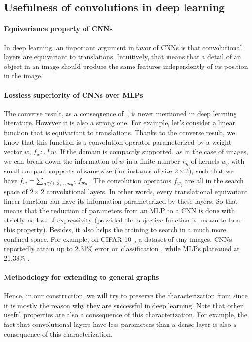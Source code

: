 \subsection{Usefulness of convolutions in deep learning}
\label{sec:cnnvsmlp}

\paragraph{Equivariance property of CNNs}
In deep learning, an important argument in favor of CNNs is that convolutional layers are equivariant to translations. Intuitively, that means that a detail of an object in an image should produce the same features independently of its position in the image.

\paragraph{Lossless superiority of CNNs over MLPs}
The converse result, as a consequence of~, is never mentioned in deep learning literature. However it is also a strong one. For example, let's consider a linear function that is equivariant to translations. Thanks to the converse result, we know that this function is a convolution operator parameterized by a weight vector $w$, $f_w : . \ast w$. If the domain is compactly supported, as in the case of images, we can break down the information of $w$ in a finite number $n_q$ of kernels $w_q$  with small compact supports of same size (for instance of size $2 \times 2$), such that we have $f_w = \sum_{q \in \{1, 2, \ldots, n_q\}} f_{w_q}$. The convolution operators $f_{w_q}$ are all in the search space of $2 \times 2$ convolutional layers. In other words, every translational equivariant linear function can have its information parameterized by these layers. So that means that the reduction of parameters from an MLP to a CNN is done with strictly no loss of expressivity (provided the objective function is known to bear this property). Besides, it also helps the training to search in a much more confined space. For example, on CIFAR-10~\citep{krizhevsky2009learning}, a dataset of tiny images, CNNs reportedly attain up to 2.31\% error on classification \citep{yamada2018shakedrop}, while MLPs plateaued at 21.38\% \citep{lin2015}.

\paragraph{Methodology for extending to general graphs}
Hence, in our construction, we will try to preserve the characterization from  since it is mostly the reason why they are successful in deep learning. Note that other useful properties are also a consequence of this characterization. For example, the fact that convolutional layers have less parameters than a dense layer is also a consequence of this characterization.







